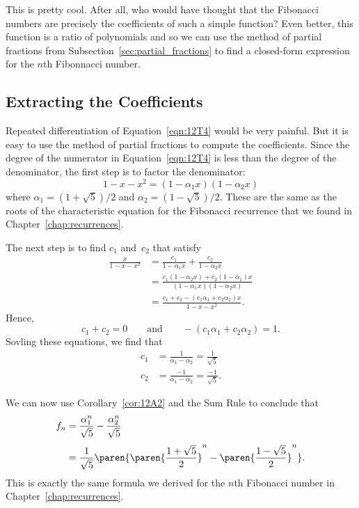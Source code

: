 This is pretty cool.  After all, who would have thought that the
Fibonacci numbers are precisely the coefficients of such a simple
function?  Even better, this function is a ratio of polynomials and so
we can use the method of partial fractions from
Subsection~\ref{sec:partial_fractions} to find a closed-form
expression for the $n$th Fibonnacci number.

\subsection{Extracting the Coefficients}

Repeated differentiation of Equation~\ref{eqn:12T4} would be very
painful.  But it is easy to use the method of partial fractions to
compute the coefficients.  Since the degree of the numerator in
Equation~\ref{eqn:12T4} is less than the degree of the denominator,
the first step is to factor the denominator:
\begin{equation*}
    1 - x - x^2 = (1 - \alpha_1 x) (1 - \alpha_2 x)
\end{equation*}
where $\alpha_1 = (1 + \sqrt{5})/2$ and $\alpha_2 = (1 - \sqrt{5})/2$.
These are the same as the roots of the characteristic equation for the
Fibonacci recurrence that we found in Chapter~\ref{chap:recurrences}.

The next step is to find $c_1$ and~$c_2$ that satisfy
\begingroup
\openup 3pt
\begin{align*}
\frac{x}{1 - x - x^2}
    &= \frac{c_1}{1 - \alpha_1 x} + \frac{c_2}{1 - \alpha_2 x} \\
    &= \frac{c_1 (1 - \alpha_2 x) + c_2 (1 - \alpha_1) x}
            {(1 - \alpha_1 x) (1 - \alpha_2 x)} \\
    &= \frac{c_1 + c_2 - (c_1 \alpha_1 + c_2 \alpha_2) x}
            {1 - x - x^2}.
\end{align*}
\endgroup
Hence,
\begin{equation*}
    c_1 + c_2 = 0
    \qquad\text{and}\qquad
    - (c_1 \alpha_1 + c_2 \alpha_2) = 1.
\end{equation*}
Sovling these equations, we find that
\begin{align*}
    c_1 &= \frac{1}{\alpha_1 - \alpha_2} = \frac{1}{\sqrt{5}} \\
    c_2 &= \frac{-1}{\alpha_1 - \alpha_2} = \frac{-1}{\sqrt{5}}.
\end{align*}

We can now use Corollary~\ref{cor:12A2} and the Sum Rule to conclude
that
\begin{align*}
f_n &= \frac{\alpha_1^n}{\sqrt{5}} - \frac{\alpha_2^n}{\sqrt{5}} \\[3pt]
    &= \frac{1}{\sqrt{5}}
        \paren{
            \paren{\frac{1 + \sqrt{5}}{2}}^n - \paren{\frac{1 - \sqrt{5}}{2}}^n
        }.
\end{align*}
This is exactly the same formula we derived for the $n$th Fibonacci
number in Chapter~\ref{chap:recurrences}.

